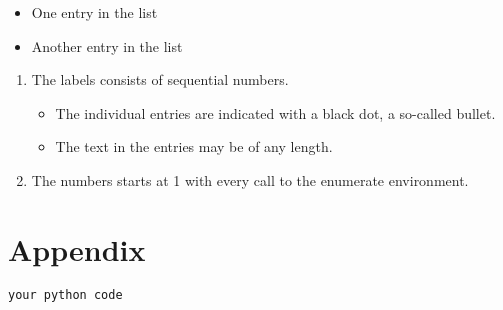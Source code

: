 \documentclass{article}
\begin{document}
\begin{itemize}
  \item One entry in the list
  \item Another entry in the list
\end{itemize}

\begin{enumerate}
   \item The labels consists of sequential numbers.
   \begin{itemize}
     \item The individual entries are indicated with a black dot, a so-called bullet.
     \item The text in the entries may be of any length.
   \end{itemize}
   \item The numbers starts at 1 with every call to the enumerate environment.
\end{enumerate}


\section{Appendix}
\begin{lstlisting}[language=Python, caption=Python Code]
your python code
\end{lstlisting}




\section{}
\end{document}
